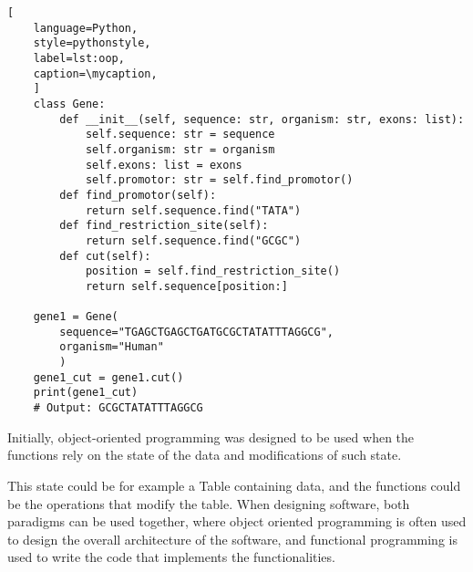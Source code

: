 \def\mycaption{ Example of a class in python. The class is called
    \texttt{Person} and has two functions, ``\texttt{\_\_init\_\_}'' and
    ``\texttt{say\_hello}''. The function ``\texttt{\_\_init\_\_}'' is called
    when creating (``initializing'') an object and fills the object with data.
    The parameter ``\texttt{self}'' is used to reference the object itself
    internally. The function ``\texttt{say\_hello}'' is a method that prints the
    string ``Hello!'' when called. The method ``\texttt{introduce}'' is a method
    that calls the method ``\texttt{say\_hello}'' and comines the string ``I
    am'' with the name of the object. }
\begin{lstlisting}[
    language=Python,
    style=pythonstyle,
    label=lst:oop,
    caption=\mycaption,
    ]
    class Gene:
        def __init__(self, sequence: str, organism: str, exons: list):
            self.sequence: str = sequence
            self.organism: str = organism
            self.exons: list = exons
            self.promotor: str = self.find_promotor()
        def find_promotor(self):
            return self.sequence.find("TATA")
        def find_restriction_site(self):
            return self.sequence.find("GCGC")
        def cut(self):
            position = self.find_restriction_site()
            return self.sequence[position:]
            
    gene1 = Gene(
        sequence="TGAGCTGAGCTGATGCGCTATATTTAGGCG", 
        organism="Human"
        )
    gene1_cut = gene1.cut()
    print(gene1_cut)
    # Output: GCGCTATATTTAGGCG
\end{lstlisting}



Initially, object-oriented programming was designed to
be used when the functions rely on the state of the data and
modifications of such state.

This state could be for example a Table containing data, and the functions could
be the operations that modify the table. When designing software, both paradigms
can be used together, where object oriented programming is often used to design
the overall architecture of the software, and functional programming is used to
write the code that implements the functionalities.




